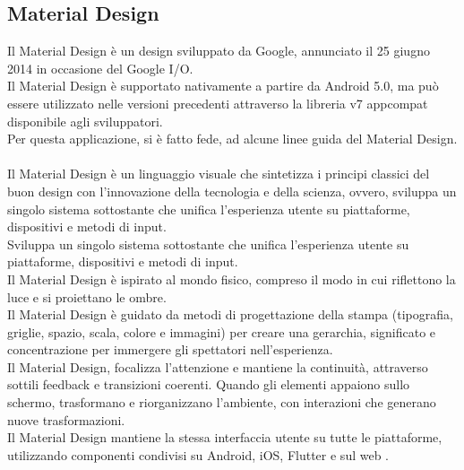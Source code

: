 \subsection{Material Design}
\label{materialdesign}
Il Material Design è un design sviluppato da Google, annunciato il 25 giugno 2014 in occasione del Google I/O.
\\Il Material Design è supportato nativamente a partire da Android 5.0, ma può essere utilizzato nelle versioni precedenti attraverso la libreria v7 appcompat disponibile agli sviluppatori. 
\\Per questa applicazione, si è fatto fede, ad alcune linee guida del Material Design.
\\\\Il Material Design è un linguaggio visuale che sintetizza i principi classici del buon design con l'innovazione della tecnologia e della scienza, ovvero, sviluppa un singolo sistema sottostante che unifica l'esperienza utente su piattaforme, dispositivi e metodi di input.
\\Sviluppa un singolo sistema sottostante che unifica l'esperienza utente su piattaforme, dispositivi e metodi di input.
\\Il Material Design è ispirato al mondo fisico, compreso il modo in cui riflettono la luce e si proiettano le ombre.
\\Il Material Design è guidato da metodi di progettazione della stampa (tipografia, griglie, spazio, scala, colore e immagini) per creare una gerarchia, significato e concentrazione per immergere gli spettatori nell'esperienza.
\\Il Material Design, focalizza l'attenzione e mantiene la continuità, attraverso sottili feedback e transizioni coerenti. Quando gli elementi appaiono sullo schermo, trasformano e riorganizzano l'ambiente, con interazioni che generano nuove trasformazioni.
\\Il Material Design mantiene la stessa interfaccia utente su tutte le piattaforme, utilizzando componenti condivisi su Android, iOS, Flutter e sul web \cite{materialdesign}.